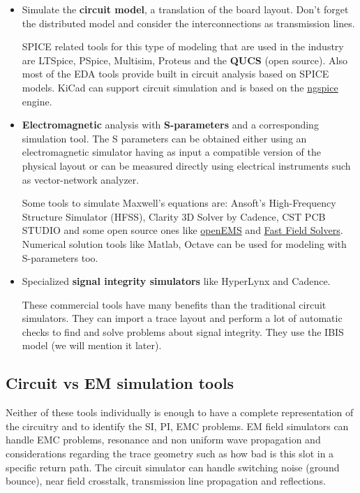 \documentclass[final]{cubedoc}
\begin{document}
	\begin{itemize}
		\item Simulate the \textbf{circuit model}, a translation of the board layout. 
		Don't forget the distributed model and consider the interconnections as transmission lines.
		
		SPICE related tools for this type of modeling that are used in the industry are LTSpice, PSpice, Multisim, Proteus and the \textbf{QUCS} (open source). Also most of the EDA tools provide built in circuit analysis based on SPICE models. KiCad can support circuit simulation and is based on the \href{http://ngspice.sourceforge.net/ngspice-eeschema.html}{ngspice} engine.
		
		
		\item \textbf{Electromagnetic} analysis with \textbf{S-parameters} and a corresponding simulation tool. The S parameters can be obtained either using an electromagnetic simulator having as input a compatible version of the physical layout or can be measured directly using electrical instruments such as vector-network analyzer. 
		
		Some tools to simulate Maxwell's equations are: Ansoft’s High-Frequency Structure Simulator (HFSS), Clarity 3D Solver by Cadence, CST PCB STUDIO and some open source ones like \href{https://www.opensourceimaging.org/project/open-ems-a-free-and-open-electromagnetic-field-solver/}{openEMS} and \href{https://www.fastfieldsolvers.com/}{Fast Field Solvers}.
		Numerical solution tools like Matlab, Octave can be used for modeling with S-parameters too.
		
		\item Specialized \textbf{signal integrity simulators} like HyperLynx and Cadence.
		
		These commercial tools have many benefits than the traditional circuit simulators. They can import a trace layout and perform a lot of automatic checks to find and solve problems about signal integrity. They use the IBIS model (we will mention it later).
	\end{itemize}
	
	\subsection{Circuit vs EM simulation tools}
	
	Neither of these tools individually is enough to have a complete representation of the circuitry and to identify the SI, PI, EMC problems. EM field simulators can handle EMC problems, resonance and non uniform wave propagation and considerations regarding the trace geometry such as how bad is this slot in a specific return path. The circuit simulator can handle switching noise (ground bounce), near field crosstalk, transmission line propagation and reflections.	
	
\end{document}
